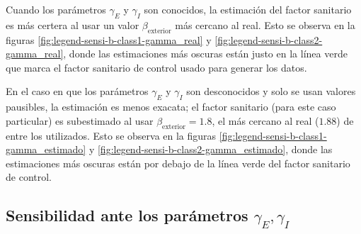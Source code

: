 Cuando los parámetros \(\gamma_E\) y \(\gamma_I\) son conocidos, la estimación del factor sanitario es más certera al usar un valor \(\beta_{\text{exterior}}\) más cercano al real. Esto se observa en la figuras \ref{fig:legend-sensi-b-class1-gamma_real} y \ref{fig:legend-sensi-b-class2-gamma_real}, donde las estimaciones más oscuras están justo en la línea verde que marca el factor sanitario de control usado para generar los datos.

En el caso en que los parámetros \(\gamma_E\) y \(\gamma_I\) son desconocidos y solo se usan valores pausibles, la estimación es menos exacata; el factor sanitario (para este caso particular) es subestimado al usar \(\beta_{\text{exterior}} = 1.8\), el más cercano al real (\(1.88\)) de entre los utilizados. Esto se observa en la figuras \ref{fig:legend-sensi-b-class1-gamma_estimado} y \ref{fig:legend-sensi-b-class2-gamma_estimado}, donde las estimaciones más oscuras están por debajo de la línea verde del factor sanitario de control.





\subsection{Sensibilidad ante los parámetros \(\gamma_E, \gamma_I\)} \label{subsec:sensigamma}

